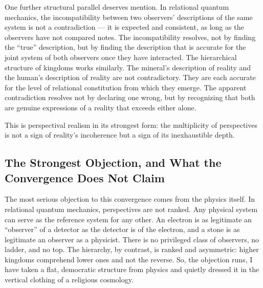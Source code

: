One further structural parallel deserves mention.
In relational quantum mechanics, the incompatibility between two observers' descriptions of the same system is not a contradiction --- it is expected and consistent, as long as the observers have not compared notes.
The incompatibility resolves, not by finding the ``true'' description, but by finding the description that is accurate for the joint system of both observers once they have interacted.
The hierarchical structure of \bahai kingdoms works similarly.
The mineral's description of reality and the human's description of reality are not contradictory.
They are each accurate for the level of relational constitution from which they emerge.
The apparent contradiction resolves not by declaring one wrong, but by recognizing that both are genuine expressions of a reality that exceeds either alone.

This is perspectival realism in its strongest form: the multiplicity of perspectives is not a sign of reality's incoherence but a sign of its inexhaustible depth.

\subsection{The Strongest Objection, and What the Convergence Does Not Claim}

The most serious objection to this convergence comes from the physics itself.
In relational quantum mechanics, perspectives are not ranked.
Any physical system can serve as the reference system for any other.
An electron is as legitimate an ``observer'' of a detector as the detector is of the electron, and a stone is as legitimate an observer as a physicist.
There is no privileged class of observers, no ladder, and no top.
The \bahai hierarchy, by contrast, is ranked and asymmetric: higher kingdoms comprehend lower ones and not the reverse.
So, the objection runs, I have taken a flat, democratic structure from physics and quietly dressed it in the vertical clothing of a religious cosmology.

